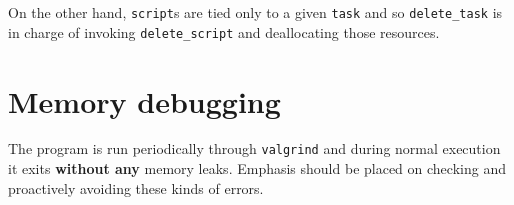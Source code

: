 \documentclass[a4paper,12pt]{book}
\newcommand{\code}[1]{\texttt{#1}}
\begin{document}
On the other hand, \code{script}s are tied only to a given \code{task} and so
\code{delete\_task} is in charge of invoking \code{delete\_script} and
deallocating those resources.

\section{Memory debugging}

The program is run periodically through \code{valgrind} and during normal
execution it exits \textbf{without any} memory leaks. Emphasis should be placed
on checking and proactively avoiding these kinds of errors.
\end{document}

